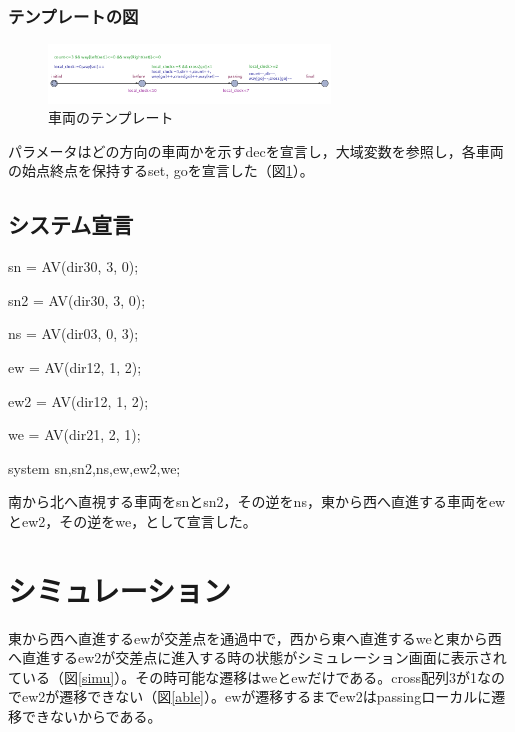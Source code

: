 \documentclass[twocolumn,a4paper]{jsarticle}
\begin{document}
\subsubsection{テンプレートの図}
\begin{figure}
  \centering
  \includegraphics[width=75mm]{temp.png}
  \caption{車両のテンプレート}
  \label{temp}
\end{figure}
パラメータはどの方向の車両かを示すdecを宣言し，大域変数を参照し，各車両の始点終点を保持するset, goを宣言した（図\ref{temp}）。
\subsection{システム宣言}
sn = AV(dir30, 3, 0);

sn2 = AV(dir30, 3, 0);

ns = AV(dir03, 0, 3);

ew = AV(dir12, 1, 2);

ew2 = AV(dir12, 1, 2);

we = AV(dir21, 2, 1);

system	sn,sn2,ns,ew,ew2,we;

南から北へ直視する車両をsnとsn2，その逆をns，東から西へ直進する車両をewとew2，その逆をwe，として宣言した。
\section{シミュレーション}
東から西へ直進するewが交差点を通過中で，西から東へ直進するweと東から西へ直進するew2が交差点に進入する時の状態がシミュレーション画面に表示されている（図\ref{simu}）。その時可能な遷移はweとewだけである。cross配列3が1なのでew2が遷移できない（図\ref{able}）。ewが遷移するまでew2はpassingローカルに遷移できないからである。
\end{document}
